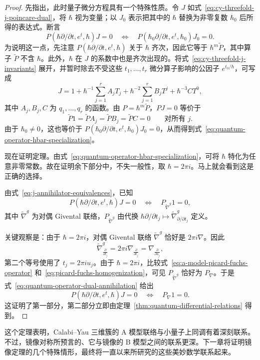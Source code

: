 \begin{proof}
先指出，此时量子微分方程具有一个特殊性质。令 $J$ 如式~\eqref{eq:cy-threefold-j-poincare-dual}，将 $\hbar$ 视为变量；以 $J_0$ 表示把其中的 $\hbar$ 替换为非零复数 $\hbar_0$ 后所得的表达式。断言
\begin{equation}\label{eq:quantum-operator-hbar-specialization}
P(\hbar\partial/\partial t,e^t,\hbar)J=0
\quad\Longleftrightarrow\quad
P(\hbar_0\partial/\partial t,e^t,\hbar_0)J_0=0.
\end{equation}
 为说明这一点，先注意 $P(\hbar\partial/\partial t,e^t,\hbar)$ 关于 $\hbar$ 齐次，因此它等于 $\hbar^m\widetilde P$，其中算子 $\widetilde P$ 不含 $\hbar$。此外，$\hbar$ 在 $J$ 的系数中也是齐次出现的。将式~\eqref{eq:cy-threefold-j-invariants} 展开，并暂时除去不受这些 $t_1,\ldots,t_r$ 微分算子影响的公因子 $e^{t_0/\hbar}$，可写成
\[
J=1+\hbar^{-1}\sum_{j=1}^rA_jT_j
+\hbar^{-2}\sum_{j=1}^rB_jT^j+\hbar^{-3}CT^0,
\]
其中 $A_j,B_j,C$ 为 $q_1,\ldots,q_r$ 的函数。由 $P=\hbar^m\widetilde P$，$PJ=0$ 等价于
\[
\widetilde P1=\widetilde PA_j=\widetilde PB_j=\widetilde PC=0
\qquad\text{对所有 }j.
\]
由于 $\hbar_0\ne0$，这也等价于 $P(\hbar_0\partial/\partial t,e^t,\hbar_0)J_0=0$，从而得到式~\eqref{eq:quantum-operator-hbar-specialization}。

 现在证明定理。由式~\eqref{eq:quantum-operator-hbar-specialization}，可将 $\hbar$ 特化为任意非零常数。故在证明余下部分中，不失一般性，取 $\hbar=2\pi i$。马上就会看到这是正确的选择。

由式~\eqref{eq:j-annihilator-equivalences}，已知
\begin{equation}\label{eq:quantum-operator-dual-annihilation}
P(\hbar\partial/\partial t,e^t,\hbar)J=0
\quad\Longleftrightarrow\quad P_{\widetilde\nabla^g}1=0,
\end{equation}
其中 $\widetilde\nabla^g$ 为对偶 Givental 联络，$P_{\widetilde\nabla^g}$ 由代换 $\hbar\partial/\partial t_j\mapsto\widetilde\nabla^g_{\partial/\partial t_j}$ 定义。

关键观察是：由于 $\hbar=2\pi i$，对偶 Givental 联络 $\widetilde\nabla^g$ 恰好是 $2\pi i\nabla$。因此
\[
\widetilde\nabla^g_{\frac\partial{\partial t_j}}
=2\pi i\nabla_{\frac\partial{\partial t_j}}
=\nabla_{\frac\partial{\partial u_j}},
\]
第二个等号使用了 $t_j=2\pi iu_j$。由于 $\hbar=2\pi i$，比较式~\eqref{eq:a-model-picard-fuchs-operator} 和~\eqref{eq:picard-fuchs-homogenization}，可见 $P_{\widetilde\nabla^g}$ 恰好为 $P_\nabla$。于是式~\eqref{eq:quantum-operator-dual-annihilation} 给出
\[
P(\hbar\partial/\partial t,e^t,\hbar)J=0\quad\Longleftrightarrow\quad P_\nabla1=0.
\]
这证明了第一部分，第二部分立即由定理~\ref{thm:quantum-differential-relations} 得到。
\end{proof}

\enlargethispage{2\baselineskip}
 这个定理表明，Calabi--Yau 三维簇的 A 模型联络与小量子上同调有着深刻联系。不过，镜像对称所预言的、它与镜像的 B 模型之间的联系更深。下一章将证明镜像定理的几个特殊情形，最终将一直以来所研究的这些美妙数学联系起来。
\par\endgroup
